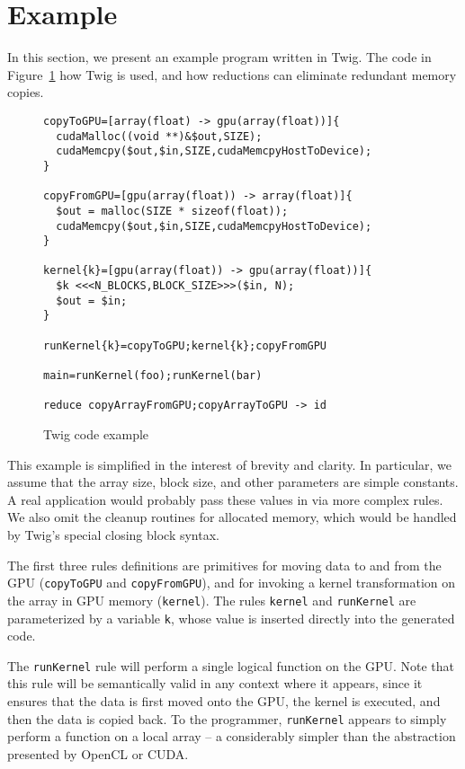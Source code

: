 
\section{Example}
\label{sec:example}

In this section, we present an example program written in Twig. The code in Figure~\ref{fig:example-code} how Twig is used, and how reductions can eliminate redundant memory copies.

\begin{figure}[ht]
\begin{verbatim}
copyToGPU=[array(float) -> gpu(array(float))]{
  cudaMalloc((void **)&$out,SIZE);
  cudaMemcpy($out,$in,SIZE,cudaMemcpyHostToDevice);
}

copyFromGPU=[gpu(array(float)) -> array(float)]{
  $out = malloc(SIZE * sizeof(float));
  cudaMemcpy($out,$in,SIZE,cudaMemcpyHostToDevice);
}

kernel{k}=[gpu(array(float)) -> gpu(array(float))]{
  $k <<<N_BLOCKS,BLOCK_SIZE>>>($in, N);
  $out = $in;
}

runKernel{k}=copyToGPU;kernel{k};copyFromGPU

main=runKernel(foo);runKernel(bar)

reduce copyArrayFromGPU;copyArrayToGPU -> id
\end{verbatim}
\caption{Twig code example}
\label{fig:example-code}
\end{figure}

This example is simplified in the interest of brevity and clarity. In particular, we assume that the array size, block size, and other parameters are simple constants. A real application would probably pass these values in via more complex rules. We also omit the cleanup routines for allocated memory, which would be handled by Twig's special closing block syntax.

The first three rules definitions are primitives for moving data to and from the GPU (\texttt{copyToGPU} and \texttt{copyFromGPU}), and for invoking a kernel transformation on the array in GPU memory (\texttt{kernel}). The rules \texttt{kernel} and \texttt{runKernel} are parameterized by a variable \texttt{k}, whose value is inserted directly into the generated code.

The \texttt{runKernel} rule will perform a single logical function on the GPU. Note that this rule will be semantically valid in any context where it appears, since it ensures that the data is first moved onto the GPU, the kernel is executed, and then the data is copied back. To the programmer, \texttt{runKernel} appears to simply perform a function on a local array -- a considerably simpler than the abstraction presented by OpenCL or CUDA.

